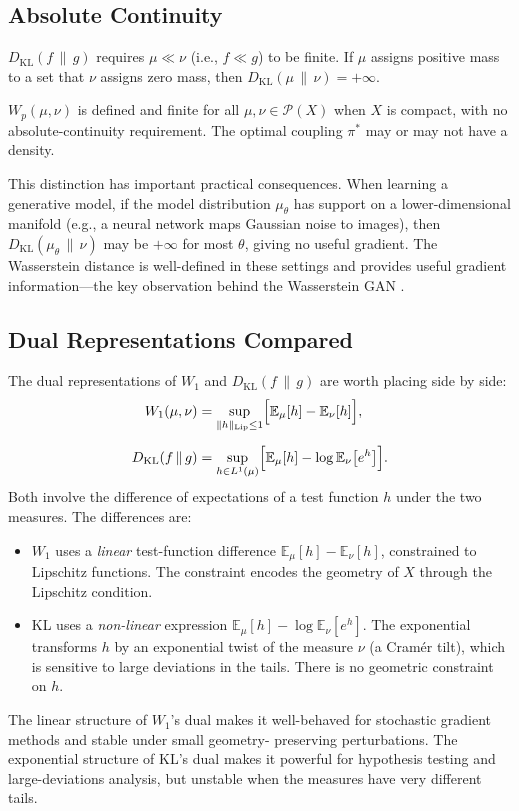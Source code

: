 \documentclass[12pt]{article}
\newcommand{\KL}[2]{D_{\mathrm{KL}}\!\left(#1\,\|\,#2\right)}
\newcommand{\E}[2]{\mathbb{E}_{#1}\!\left[#2\right]}
\newcommand{\calP}{\mathcal{P}}
\begin{document}
\subsection{Absolute Continuity}

$\KL{f}{g}$ requires $\mu \ll \nu$ (i.e., $f \ll g$) to be
finite.  If $\mu$ assigns positive mass to a set that $\nu$
assigns zero mass, then $\KL{\mu}{\nu} = +\infty$.

$W_p(\mu,\nu)$ is defined and finite for all
$\mu, \nu \in \calP(X)$ when $X$ is compact, with no
absolute-continuity requirement.  The optimal coupling
$\pi^*$ may or may not have a density.

This distinction has important practical consequences.  When
learning a generative model, if the model distribution $\mu_\theta$
has support on a lower-dimensional manifold (e.g., a neural
network maps Gaussian noise to images), then $\KL{\mu_\theta}{\nu}$
may be $+\infty$ for most $\theta$, giving no useful gradient.
The Wasserstein distance is well-defined in these settings and
provides useful gradient information---the key observation behind
the Wasserstein GAN \citep[Ch.\ 7]{PeyreCuturi2019}.

\subsection{Dual Representations Compared}

The dual representations of $W_1$ and $\KL{f}{g}$ are worth
placing side by side:
\begin{align}
  W_1(\mu,\nu)
  &= \sup_{\|h\|_{\mathrm{Lip}} \leq 1}
    \Bigl[\E{\mu}{h} - \E{\nu}{h}\Bigr],
  \label{eq:w1_dual2}\\[6pt]
  \KL{f}{g}
  &= \sup_{h \in L^1(\mu)}
    \Bigl[\E{\mu}{h} - \log\E{\nu}{e^h}\Bigr].
  \label{eq:kl_dual2}
\end{align}
Both involve the difference of expectations of a test function
$h$ under the two measures.  The differences are:
\begin{itemize}
  \item $W_1$ uses a \emph{linear} test-function difference
    $\E{\mu}{h} - \E{\nu}{h}$, constrained to Lipschitz
    functions.  The constraint encodes the geometry of $X$
    through the Lipschitz condition.
  \item KL uses a \emph{non-linear} expression
    $\E{\mu}{h} - \log\E{\nu}{e^h}$.  The exponential
    transforms $h$ by an exponential twist of the measure
    $\nu$ (a Cram\'er tilt), which is sensitive to large
    deviations in the tails.  There is no geometric constraint
    on $h$.
\end{itemize}
The linear structure of $W_1$'s dual makes it well-behaved
for stochastic gradient methods and stable under small geometry-
preserving perturbations.  The exponential structure of KL's
dual makes it powerful for hypothesis testing and large-deviations
analysis, but unstable when the measures have very different
tails.
\end{document}
